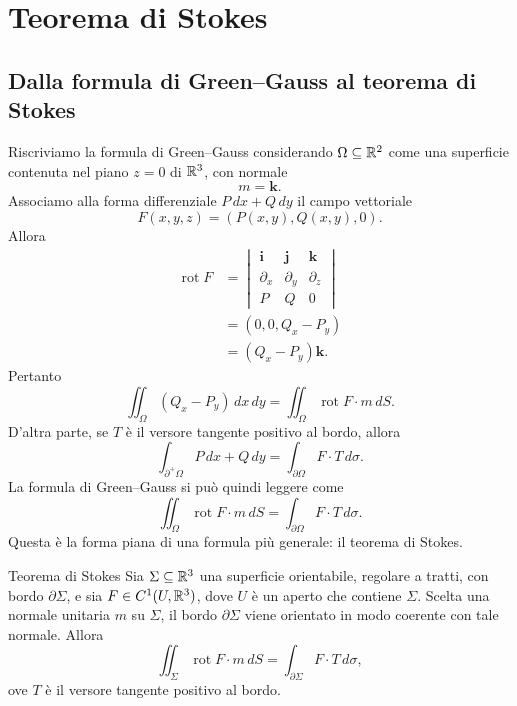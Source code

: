 \documentclass[a4paper]{article}
\begin{document}
\section{Teorema di Stokes}

\subsection{Dalla formula di Green--Gauss al teorema di Stokes}

\begin{radioactive}
Riscriviamo la formula di Green--Gauss considerando \(\Omega\subseteq\mathbb{R}^2\) come una superficie contenuta nel piano \(z=0\) di \(\mathbb{R}^3\), con normale
\[
    m=\mathbf{k}.
\]
Associamo alla forma differenziale \(P\,dx+Q\,dy\) il campo vettoriale
\[
    F(x,y,z)=(P(x,y),Q(x,y),0).
\]
Allora
\begin{align*}
    \operatorname{rot}F
    &=
    \begin{vmatrix}
        \mathbf{i} & \mathbf{j} & \mathbf{k} \\
        \partial_x & \partial_y & \partial_z \\
        P & Q & 0
    \end{vmatrix} \\
    &=(0,0,Q_x-P_y) \\
    &=(Q_x-P_y)\mathbf{k}.
\end{align*}
Pertanto
\[
    \iint_\Omega (Q_x-P_y)\,dx\,dy
    =
    \iint_\Omega \operatorname{rot}F\cdot m\,dS.
\]
D'altra parte, se \(T\) è il versore tangente positivo al bordo, allora
\[
    \int_{\partial^+\Omega}P\,dx+Q\,dy
    =
    \int_{\partial\Omega}F\cdot T\,d\sigma.
\]
La formula di Green--Gauss si può quindi leggere come
\[
    \iint_\Omega \operatorname{rot}F\cdot m\,dS
    =
    \int_{\partial\Omega}F\cdot T\,d\sigma.
\]
Questa è la forma piana di una formula più generale: il teorema di Stokes.
\end{radioactive}

\begin{radioactive}
\begin{snippettheorem}{Teorema di Stokes}
    Sia \(\Sigma\subseteq\mathbb{R}^3\) una superficie orientabile, regolare a tratti, con bordo \(\partial\Sigma\), e sia \(F\in C^1(U,\mathbb{R}^3)\), dove \(U\) è un aperto che contiene \(\Sigma\). Scelta una normale unitaria \(m\) su \(\Sigma\), il bordo \(\partial\Sigma\) viene orientato in modo coerente con tale normale. Allora
    \[
        \iint_\Sigma \operatorname{rot}F\cdot m\,dS
        =
        \int_{\partial\Sigma}F\cdot T\,d\sigma,
    \]
    ove \(T\) è il versore tangente positivo al bordo.
\end{snippettheorem}
\end{radioactive}
\end{document}
